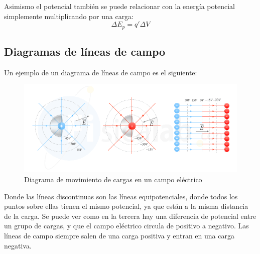 \documentclass[arial,a4paper,print]{article}
\begin{document}
Asimismo el potencial también se puede relacionar con la energía potencial simplemente multiplicando por una carga:
\begin{equation*}
	\Delta E_{p} = q'\Delta V
\end{equation*}

\pagebreak
\subsection{Diagramas de líneas de campo}
Un ejemplo de un diagrama de líneas de campo es el siguiente:
\begin{figure}[H]
	\centering
	\includegraphics[width=0.6\linewidth]{figures/potencial-e-intensidad}
	\caption{Diagrama de movimiento de cargas en un campo eléctrico}
	\label{fig:potencial-e-intensidad}
\end{figure}
Donde las líneas discontinuas son las líneas equipotenciales, donde todos los puntos sobre ellas tienen el mismo potencial, ya que están a la misma distancia de la carga. Se puede ver como en la tercera hay una diferencia de potencial entre un grupo de cargas, y que el campo eléctrico circula de positivo a negativo. Las líneas de campo siempre salen de una carga positiva y entran en una carga negativa.
\end{document}
